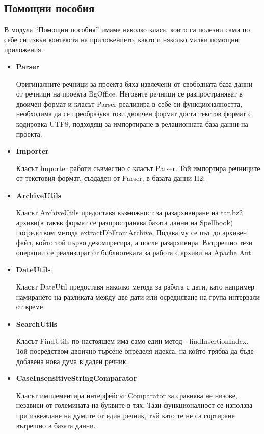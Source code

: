 \subsection{Помощни пособия}
В модула "`Помощни пособия"' имаме няколко класа, които са полезни
сами по себе си извън контекста на приложението, както и няколко малки
помощни приложения.
\begin{itemize}
  \item \textbf{Parser}

    Оригиналните речници за проекта бяха извлечени от свободната база
    данни от речници на проекта BgOffice. Неговите речници се
    разпространяват в двоичен формат и класът Parser реализира в себе
    си функционалността, необходима да се преобразува този двоичен
    формат доста текстов формат с кодировка UTF8, подходящ за
    импортиране в релационната база данни на проекта.
  \item \textbf{Importer}

    Класът Importer работи съвместно с класът Parser. Той импортира
    речниците от текстовия формат, създаден от Parser, в базата данни H2.
  \item \textbf{ArchiveUtils}

    Класът ArchiveUtils предоставя възможност за разархивиране на
    tar.bz2 архиви(в такъв формат се разпространява базата данни на
    Spellbook) посредством метода extractDbFromArchive. Подава му се
    път до архивен файл, който той първо декомпресира, а после
    разархивира. Вътррешно тези операции се реализират от библиотеката
    за работа с архиви на Apache Ant.
  \item \textbf{DateUtils}

    Класът DateUtil предоставя няколко метода за работа с дати, като
    например намирането на разликата между две дати или осредняване на
    група интервали от време. 
  \item \textbf{SearchUtils}

    Класът FindUtils по настоящем има само един метод -
    findInsertionIndex. Той посредством двоично търсене определя
    идекса, на който трябва да бъде добавена нова дума в даден
    речник.
  \item \textbf{CaseInsensitiveStringComparator}

    Класът имплементира интерфейсът Comparator за сравнява не низове,
    независи от големината на буквите в тях. Тази функционалност се
    използва при извеждане на думите от един речник, тъй като те не са
    сортиране вътрешно в базата данни.
\end{itemize}

